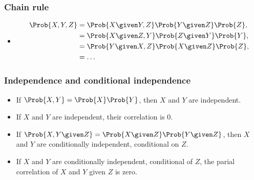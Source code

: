 \documentclass[10pt,xcolor=dvipsnames,serif,professionalfont]{beamer} %
\begin{document}
\begin{frame}
	\frametitle{Chain rule}
\begin{itemize}
	\item 
		\begin{align}
			\Prob{X, Y, Z} &= \Prob{X \given Y, Z} \Prob{Y\given Z} \Prob{Z},\\
			 &= \Prob{X \given Z, Y} \Prob{Z \given Y} \Prob{Y},\\
			 &= \Prob{Y \given X, Z} \Prob{X \given Z} \Prob{Z},\\
			 &= \ldots
		\end{align}
\end{itemize}
\end{frame}

\begin{frame}
	\frametitle{Independence and conditional independence}
\begin{itemize}
	\item If $\Prob{X, Y} = \Prob{X}\Prob{Y}$, then $X$ and $Y$ are independent.
	\item If $X$ and $Y$ are independent, their correlation is $0$.
	\item If $\Prob{X, Y \given Z} = \Prob{X \given Z} \Prob{Y \given Z}$, then $X$ and $Y$ are conditionally independent, conditional on $Z$.
	\item If $X$ and $Y$ are conditionally independent, conditional of $Z$, the parial correlation of $X$ and $Y$ given $Z$ is zero.
\end{itemize}
\end{frame}
\end{document}
